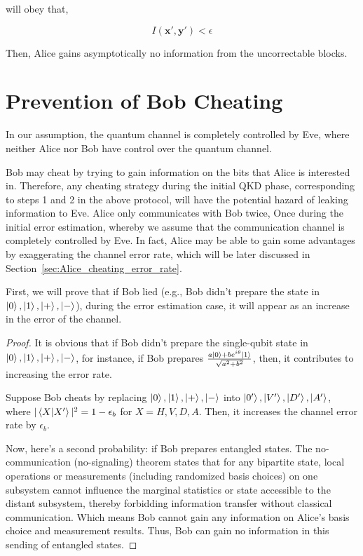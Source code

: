 \documentclass[%
 reprint,
superscriptaddress,
 amsmath,amssymb,
 aps,
]{revtex4-2}
\begin{document}
will obey that,

\begin{equation}
    I(\mathbf{x'}, \mathbf{y'})<\epsilon
\end{equation}

Then, Alice gains asymptotically no information from the uncorrectable blocks.


\section{Prevention of Bob Cheating}

In our assumption, the quantum channel is completely controlled by Eve, where neither Alice nor Bob have control over the quantum channel.

Bob may cheat by trying to gain information on the bits that Alice is interested in. Therefore, any cheating strategy during the initial QKD phase, corresponding to steps 1 and 2 in the above protocol, will have the potential hazard of leaking information to Eve. Alice only communicates with Bob twice, Once during the initial error estimation, whereby we assume that the communication channel is completely controlled by Eve. In fact, Alice may be able to gain some advantages by exaggerating the channel error rate, which will be later discussed in Section~\ref{sec:Alice_cheating_error_rate}.

First, we will prove that if Bob lied (e.g., Bob didn't prepare the state in $\ket{0}, \ket{1}, \ket{+}, \ket{-}$), during the error estimation case, it will appear as an increase in the error of the channel.

\begin{proof}
    It is obvious that if Bob didn't prepare the single-qubit state in $\ket{0}, \ket{1}, \ket{+}, \ket{-}$, for instance, if Bob prepares $\frac{a\ket{0}+be^{i\theta}\ket{1}}{\sqrt{a^2+b^2}}$, then, it contributes to increasing the error rate.

    Suppose Bob cheats by replacing $\ket{0}, \ket{1}, \ket{+}, \ket{-}$ into $\ket{0'}, \ket{V'}, \ket{D'}, \ket{A'}$, where $|\bra{X}\ket{X'}|^2=1-\epsilon_b$ for $X=H, V, D, A$. Then, it increases the channel error rate by $\epsilon_b$.

    Now, here's a second probability: if Bob prepares entangled states. The no-communication (no-signaling) theorem states that for any bipartite state, local operations or measurements (including randomized basis choices) on one subsystem cannot influence the marginal statistics or state accessible to the distant subsystem, thereby forbidding information transfer without classical communication. Which means Bob cannot gain any information on Alice's basis choice and measurement results. Thus, Bob can gain no information in this sending of entangled states. 

\end{proof}
\end{document}
